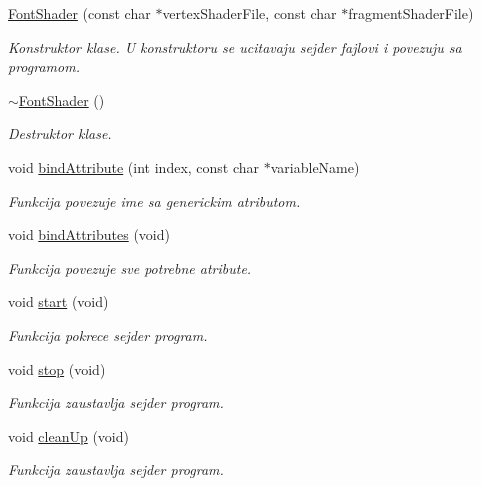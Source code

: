 \begin{DoxyCompactItemize}
\item 
\hyperlink{classshader_1_1FontShader_ab4e52a49071555c4abaaf0c19aa7892f}{Font\+Shader} (const char $\ast$vertex\+Shader\+File, const char $\ast$fragment\+Shader\+File)
\begin{DoxyCompactList}\small\item\em Konstruktor klase. U konstruktoru se ucitavaju sejder fajlovi i povezuju sa programom. \end{DoxyCompactList}\item 
\hyperlink{classshader_1_1FontShader_ad74a8facae98d230f10f3727a539be90}{$\sim$\+Font\+Shader} ()
\begin{DoxyCompactList}\small\item\em Destruktor klase. \end{DoxyCompactList}\item 
void \hyperlink{classshader_1_1FontShader_abcd615d45f374de430a10226212fa40b}{bind\+Attribute} (int index, const char $\ast$variable\+Name)
\begin{DoxyCompactList}\small\item\em Funkcija povezuje ime sa generickim atributom. \end{DoxyCompactList}\item 
void \hyperlink{classshader_1_1FontShader_abd2634c5c218f6912c9cc5d63899aca9}{bind\+Attributes} (void)
\begin{DoxyCompactList}\small\item\em Funkcija povezuje sve potrebne atribute. \end{DoxyCompactList}\item 
void \hyperlink{classshader_1_1FontShader_a15d46dfb7b060d5b067b2df5be395081}{start} (void)
\begin{DoxyCompactList}\small\item\em Funkcija pokrece sejder program. \end{DoxyCompactList}\item 
void \hyperlink{classshader_1_1FontShader_a5cf531aabad7073196cddda0d2514392}{stop} (void)
\begin{DoxyCompactList}\small\item\em Funkcija zaustavlja sejder program. \end{DoxyCompactList}\item 
void \hyperlink{classshader_1_1FontShader_a9df3b86fb4829d2505cf508b95a6238f}{clean\+Up} (void)
\begin{DoxyCompactList}\small\item\em Funkcija zaustavlja sejder program. \end{DoxyCompactList}\item 

\end{DoxyCompactItemize}
